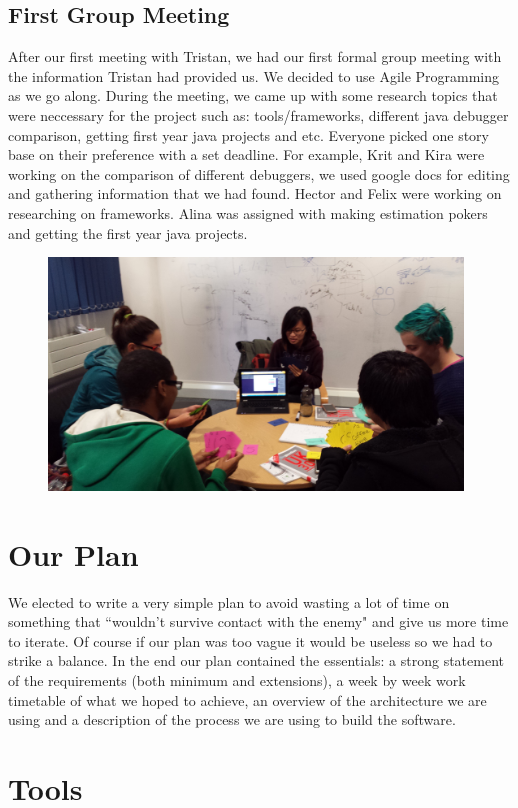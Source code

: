 \documentclass[11pt]{article}
\begin{document}
\subsection{First Group Meeting}
After our first meeting with Tristan, we had our first formal group meeting with the information Tristan had provided us. We decided to use Agile Programming as we go along. During the meeting, we came up with some research topics that were neccessary for the project such as: tools/frameworks, different java debugger comparison, getting first year java projects and etc. Everyone picked one story base on their preference with a set deadline. For example, Krit and Kira were working on the comparison of different debuggers, we used google docs for editing and gathering information that we had found. Hector and Felix were working on researching on frameworks. Alina was assigned with making estimation pokers and getting the first year java projects. 
\begin{figure}[h!]
\centering
\includegraphics[width=110mm]{estimation.jpg}
\end{figure}  

\section{Our Plan}

We elected to write a very simple plan to avoid wasting a lot of time on something that ``wouldn't survive contact with the enemy" and give us more time to iterate. 
Of course if our plan was too vague it would be useless so we had to strike a balance.
In the end our plan contained the essentials: a strong statement of the requirements (both minimum and extensions), a week by week work timetable of what we hoped to achieve, an overview of the architecture we are using and a description of the process we are using to build the software.


\section{Tools}
\end{document}
